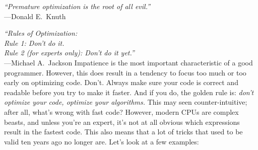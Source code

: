 \documentclass[openany,oneside]{report}
\renewenvironment{quote}{\list{}{\leftmargin=8\parindent}\item\relax}{\endlist}
\begin{document}
\begin{quote}\small
\emph{``Premature optimization is the root of all evil.''} \\ \hspace*{\fill}---Donald E.\ Knuth
\end{quote}
\begin{quote}\small
\emph{``Rules of Optimization: \\ Rule 1: Don't do it. \\ Rule 2 (for experts only): Don't do it yet.''} \\ \hspace*{\fill}---Michael A.\ Jackson
\end{quote}
Impatience is the most important characteristic of a good programmer.
However, this does result in a tendency to focus too much or too early on optimizing code. Don't.
Always make sure your code is correct and readable before you try to make it faster.
And if you do, the golden rule is: \emph{don't optimize your code, optimize your algorithms.}
This may seen counter-intuitive; after all, what's wrong with fast code?
However, modern CPUs are complex beasts, and unless you're an expert, it's not at all obvious which expressions result in the fastest code.
This also means that a lot of tricks that used to be valid ten years ago no longer are.
Let's look at a few examples:
\end{document}
